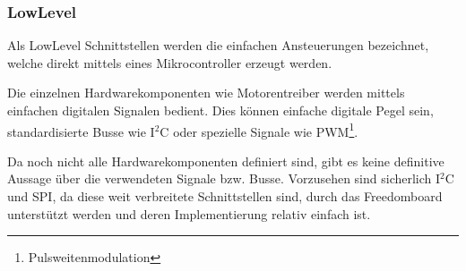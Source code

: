 \subsubsection{LowLevel}
Als LowLevel Schnittstellen werden die einfachen Ansteuerungen
bezeichnet, welche direkt mittels eines Mikrocontroller erzeugt
werden.

Die einzelnen Hardwarekomponenten wie Motorentreiber werden mittels
einfachen digitalen Signalen bedient. Dies können einfache digitale
Pegel sein, standardisierte Busse wie I$^2$C oder spezielle Signale
wie PWM\footnote{Pulsweitenmodulation}. 

Da noch nicht alle Hardwarekomponenten definiert sind, gibt es keine
definitive Aussage über die verwendeten Signale bzw. Busse. Vorzusehen
sind sicherlich I$^2$C und SPI, da diese weit verbreitete Schnittstellen
sind, durch das Freedomboard unterstützt werden und deren
Implementierung relativ einfach ist.
